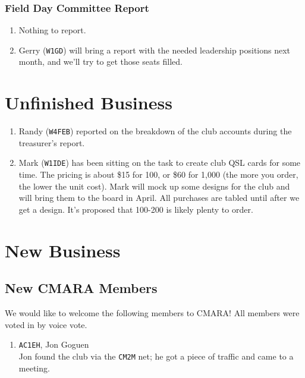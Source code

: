 \documentclass[10pt,letterpaper]{article}
\begin{document}
\subsubsection{Field Day Committee Report}
\begin{enumerate}
  \item Nothing to report.
  \item Gerry (\texttt{W1GD}) will bring a report with the needed leadership positions next month, and we'll try to get those seats filled.
\end{enumerate}

\section{Unfinished Business}
\begin{enumerate}
  \item Randy (\texttt{W4FEB}) reported on the breakdown of the club accounts during the treasurer's report.
  \item Mark (\texttt{W1IDE}) has been sitting on the task to create club QSL cards for some time. The pricing is about \$15 for 100, or \$60 for 1,000 (the more you order, the lower the unit cost). Mark will mock up some designs for the club and will bring them to the board in April. All purchases are tabled until after we get a design. It's proposed that 100-200 is likely plenty to order.
\end{enumerate}

\section{New Business}

\subsection{New CMARA Members}
\label{new-cmara-members}
We would like to welcome the following members to CMARA! All members were voted in by voice vote.
\begin{enumerate}
  \item \texttt{AC1EH}, Jon Goguen\\ Jon found the club via the \texttt{CM2M} net; he got a piece of traffic and came to a meeting.
\end{enumerate}
\end{document}
